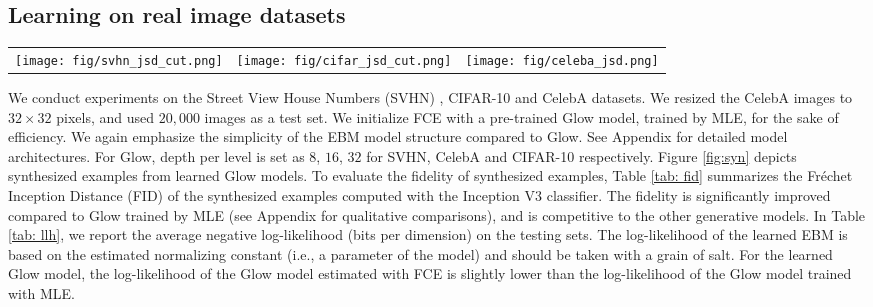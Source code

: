\documentclass[10pt,twocolumn,letterpaper]{article}
\begin{document}
\subsection{Learning on real image datasets}
\begin{figure*}
\begin{center}
\setlength{\tabcolsep}{8pt}
\begin{tabular}{ccc}
  \texttt{[image: fig/svhn\_jsd\_cut.png]}   & \texttt{[image: fig/cifar\_jsd\_cut.png]} & 
  \texttt{[image: fig/celeba\_jsd.png]}
\end{tabular}
\caption{Synthesized examples from the Glow model learned by FCE. From left to right panels are from SVHN, CIFAR-10 and CelebA datasets, respectively. The image size is $32 \times 32$.}
\label{fig:syn}
\end{center}
\end{figure*}
We conduct experiments on the Street View House Numbers (SVHN) \cite{netzer2011reading}, CIFAR-10 \cite{krizhevsky2009learning} and CelebA \cite{liu2015faceattributes} datasets. We resized the CelebA images to $32 \times 32$ pixels, and used $20,000$ images as a test set. We initialize FCE with a pre-trained Glow model, trained by MLE, for the sake of efficiency. We again emphasize the simplicity of the EBM model structure compared to Glow. See Appendix for detailed model architectures. For Glow, depth per level \cite{kingma2018Glow} is set as $8$, $16$, $32$ for SVHN, CelebA and CIFAR-10 respectively. Figure \ref{fig:syn} depicts synthesized examples from learned Glow models. To evaluate the fidelity of synthesized examples, Table \ref{tab: fid} summarizes the Fr\'echet Inception Distance (FID) \cite{heusel2017gans} of the synthesized examples computed with the Inception V3 \cite{szegedy2016rethinking} classifier. The fidelity is significantly improved compared to Glow trained by MLE (see Appendix for qualitative comparisons), and is competitive to the other generative models. In Table \ref{tab: llh}, we report the average negative log-likelihood (bits per dimension) on the testing sets. The log-likelihood of the learned EBM is based on the estimated normalizing constant (i.e., a parameter of the model) and should be taken with a grain of salt. 
For the learned Glow model, the log-likelihood of the Glow model estimated with FCE is slightly lower than the log-likelihood of the Glow model trained with MLE. 
\end{document}
